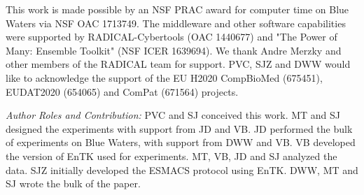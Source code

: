 \footnotesize

This work is made possible by an NSF PRAC award for computer time on Blue Waters via
NSF OAC	1713749. The middleware and other software capabilities were supported by RADICAL-Cybertools (OAC 1440677) and "The Power of Many: Ensemble Toolkit" (NSF ICER 1639694). We thank Andre Merzky and other members of the RADICAL team for support. PVC, SJZ and DWW would like to acknowledge the support of the EU H2020 CompBioMed (675451), EUDAT2020 (654065) and ComPat (671564) projects.

{\it Author Roles and Contribution:} PVC and SJ conceived this work. MT and SJ
designed the experiments with support from JD and VB. JD performed the bulk of
experiments on Blue Waters, with support from DWW and VB. VB developed the
version of EnTK used for experiments. MT, VB, JD and SJ analyzed the data. SJZ
initially developed the ESMACS protocol using EnTK. DWW, MT and SJ wrote the
bulk of the paper.







